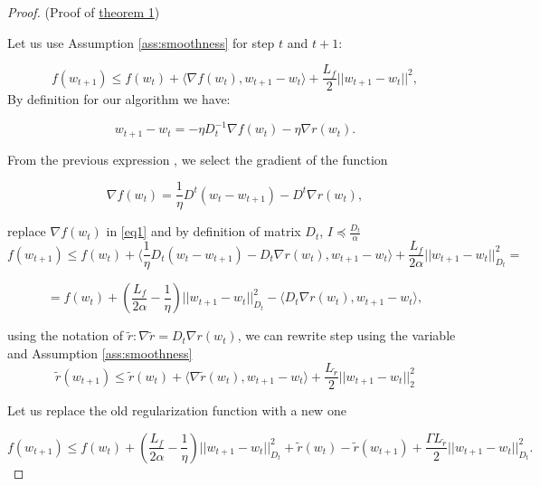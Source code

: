 \documentclass[USenglish]{article}
\theoremstyle{dgthm}
\theoremstyle{dgdef}
\begin{document}
\begin{proof} (Proof of \hyperref[theor:1]{theorem 1})
\label{proof:theorem1}

Let us use Assumption \eqref{ass:smoothness} for step $t$ and $t+1$:

\begin{equation} \label{eq1}
    f(w_{t+1}) \leq f(w_t) + \langle \nabla f(w_t), w_{t+1} - w_t \rangle + \frac{L_f}{2}||w_{t+1} - w_t ||^2,
\end{equation}
By definition for our algorithm we have:

\begin{equation*}
w_{t+1} - w_t = -\eta D_t^{-1} \nabla f(w_t) - \eta \nabla r(w_t).
\end{equation*}

From the previous expression , we select the gradient of the function

\begin{equation*}
\nabla f(w_t) = \frac{1}{\eta} D^t(w_t - w_{t+1}) - D^t \nabla r(w_t),
\end{equation*}

replace $\nabla f(w_t)$ in \ref{eq1} and by definition of matrix $D_t$, $I \preccurlyeq \frac{D_t}{\alpha}$
\begin{equation*}
    f(w_{t+1}) \leq f(w_t) + \langle \frac{1}{\eta}D_t(w_t - w_{t+1}) - D_t\nabla r(w_t), w_{t+1} - w_t \rangle + \frac{L_f}{2 \alpha} ||w_{t+1} - w_t||_{D_t}^2 = 
\end{equation*}

\begin{equation*}
    = f(w_t) + \left(\frac{L_f}{2 \alpha} - \frac{1}{\eta} \right) ||w_{t+1} - w_t||_{D_t}^2 - \langle D_t \nabla r(w_t), w_{t+1} - w_t \rangle,
\end{equation*}

using the notation of $\tilde{r} : \nabla \tilde{r} = D_t \nabla r(w_t)$,
we can rewrite step using the variable and Assumption \eqref{ass:smoothness}
\begin{equation*}
    \tilde{r}(w_{t+1}) \leq \tilde{r}(w_t) + \langle \nabla \tilde{r}(w_t), w_{t+1} - w_t \rangle + \frac{L_{\tilde{r}}}{2} ||w_{t+1} - w_t||_2^2
\end{equation*}

Let us replace the old regularization function with a new one

\begin{equation*}
    f(w_{t+1}) \leq f(w_t) + \left( \frac{L_f}{2\alpha} - \frac{1}{\eta} \right) ||w_{t+1} - w_t||_{D_t}^2 + \tilde{r}(w_t) - \tilde{r}(w_{t+1}) + \frac{\Gamma L_{\tilde{r}}}{2}||w_{t+1}-w_t||_{D_t}^2.
\end{equation*}


\end{proof}
\end{document}
